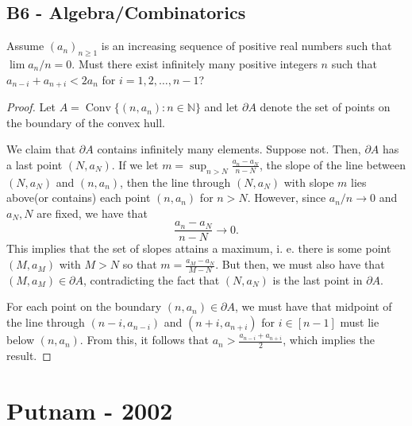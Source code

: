 \documentclass[11pt]{scrartcl}
\newcommand{\N}{\mathbb{N}}
\newcommand{\<}{\langle}
\renewcommand{\>}{\rangle}
\begin{document}
\subsection{B6 - Algebra/Combinatorics}
Assume $(a_n)_{n \ge 1}$ is an increasing sequence of positive real numbers such that $\lim a_n/n = 0$.  Must there exist infinitely many positive integers $n$ such that $a_{n-i} + a_{n+i} < 2a_n$ for $i = 1, 2, \dots, n-1$? 

\begin{proof}
Let $A = \operatorname{Conv}\{(n, a_n) : n \in \N\}$ and let $\partial A$ denote the set of points on the boundary of the convex hull.  

We claim that $\partial A$ contains infinitely many elements.  Suppose not.  Then, $\partial A$ has a last point $(N, a_N)$.  If we let $m = \sup_{n > N} \frac{a_n - a_N}{n - N}$, the slope of the line between $(N, a_N)$ and $(n, a_n)$, then the line through $(N, a_N)$ with slope $m$ lies above(or contains) each point $(n, a_n)$ for $n > N$.  However, since $a_n/n \to 0$ and $a_N, N$ are fixed, we have that $$\frac{a_n - a_N}{n - N} \to 0.$$
This implies that the set of slopes attains a maximum, i. e. there is some point $(M, a_M)$ with $M > N$ so that $m = \frac{a_M - a_N}{M - N}$.  But then, we must also have that $(M, a_M) \in \partial A$, contradicting the fact that $(N, a_N)$ is the last point in $\partial A$.

For each point on the boundary $(n, a_n) \in \partial A$, we must have that midpoint of the line through $(n-i, a_{n-i})$ and $(n+i, a_{n+i})$ for $i \in [n-1]$ must lie below $(n, a_n)$.  From this, it follows that $a_n > \frac{a_{n-i} + a_{n+i}}{2}$, which implies the result.  
\end{proof}
\pagebreak
\section{Putnam - 2002}
\end{document}
